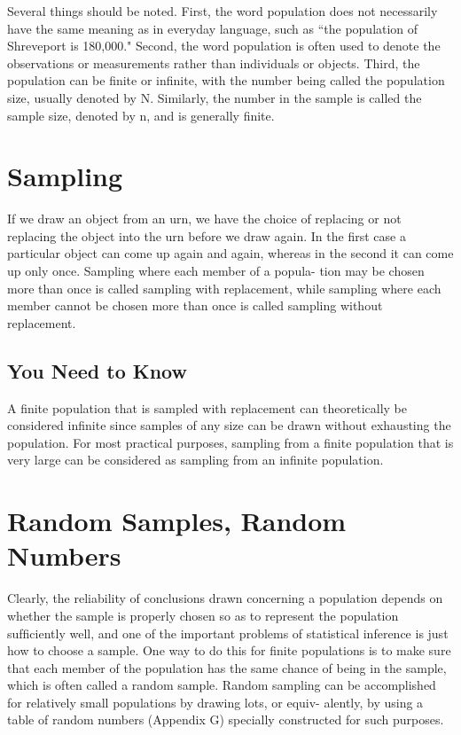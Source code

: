 Several things should be noted. First, the word population does not
necessarily have the same meaning as in everyday language, such as
“the population of Shreveport is 180,000." Second, the word population
is often used to denote the observations or measurements rather than
individuals or objects. Third, the population can be ﬁnite or inﬁnite,
with the number being called the population size, usually denoted by N.
Similarly, the number in the sample is called the sample size, denoted
by n, and is generally ﬁnite.
\section{Sampling}

If we draw an object from an urn, we have the choice of replacing or not
replacing the object into the urn before we draw again. In the ﬁrst case
a particular object can come up again and again, whereas in the second
it can come up only once. Sampling where each member of a popula-
tion may be chosen more than once is called sampling with replacement,
while sampling where each member cannot be chosen more than once
is called sampling without replacement.



\subsection{You Need to Know}
A finite population that is sampled with replacement can theoretically be considered inﬁnite since samples of any size can be drawn without exhausting the population. For
most practical purposes, sampling from a ﬁnite population that is very large can be considered as sampling from an
inﬁnite population.


\section{Random Samples, Random Numbers}

Clearly, the reliability of conclusions drawn concerning a population depends on whether the sample is properly chosen so as to represent the
population sufﬁciently well, and one of the important problems of statistical inference is just how to choose a sample.
One way to do this for ﬁnite populations is to make sure that each member of the population has the same chance of being in the sample,
which is often called a random sample. Random sampling can be accomplished for relatively small populations by drawing lots, or equiv-
alently, by using a table of random numbers (Appendix G) specially
constructed for such purposes.

